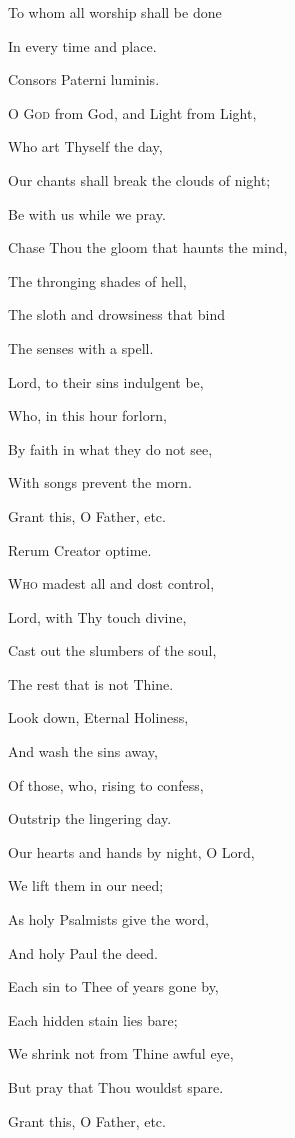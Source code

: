 To whom all worship shall be done

In every time and place.


Consors Paterni luminis.

O G\textsc{od} from God, and Light from Light,

Who art Thyself the day,

Our chants shall break the clouds of night;

Be with us while we pray.

Chase Thou the gloom that haunts the mind,

The thronging shades of hell,

The sloth and drowsiness that bind

The senses with a spell.

Lord, to their sins indulgent be,

Who, in this hour forlorn,

By faith in what they do not see,

With songs prevent the morn.

Grant this, O Father, etc.


Rerum Creator optime.

W\textsc{ho} madest all and dost control,

Lord, with Thy touch divine,

Cast out the slumbers of the soul,

The rest that is not Thine.

Look down, Eternal Holiness,

And wash the sins away,

Of those, who, rising to confess,

Outstrip the lingering day.

Our hearts and hands by night, O Lord,

We lift them in our need;

As holy Psalmists give the word,

And holy Paul the deed. 

Each sin to Thee of years gone by,

Each hidden stain lies bare;

We shrink not from Thine awful eye,

But pray that Thou wouldst spare.

Grant this, O Father, etc.

